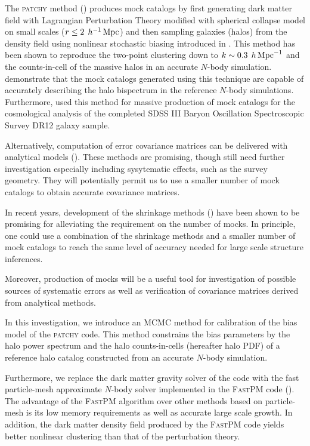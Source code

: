 The \textsc{patchy} method (\citealt{kitaura2014,kitaura2015}) produces mock catalogs by first generating dark matter field with Lagrangian Perturbation Theory modified with spherical collapse model on small scales ($r \leq 2 \; \,h^{-1}\,{\rm Mpc}$) and then sampling galaxies (halos) from the density field using nonlinear stochastic biasing introduced in \citet{kitaura2014}. This method has been shown to reproduce the two-point clustering down to $k \sim 0.3 \; \,h\,{\rm Mpc}^{-1}$ and the counts-in-cell of the massive halos in an accurate $N$-body simulation. \citet{kitaura2015} demonstrate that the mock catalogs generated using this technique are capable of accurately describing the halo bispectrum in the reference $N$-body simulations. Furthermore, \citet{kitaura2016} used this method for massive production of mock catalogs for the cosmological analysis of the completed SDSS III Baryon Oscillation Spectroscopic Survey DR12 galaxy sample. 

Alternatively, computation of error covariance matrices can be delivered with analytical models (\citealt{feldman1994,smith2008,crocce2011,sun2013,grieb2016,klaus2016}). 
These methods are promising, though still need further investigation especially including sysytematic effects, such as the survey geometry. They will potentially permit us to use a smaller number of mock catalogs to obtain accurate covariance matrices.

In recent years, development of the shrinkage methods (\citealt{ledoit2004,pope2008,ledoit2012,joachimi2016,simpson2016}) have been shown to be promising for alleviating the requirement on the number of mocks. In principle, one could use a combination of the shrinkage methods and a smaller number of mock catalogs to reach the same level of accuracy needed for large scale structure inferences.    

Moreover, production of mocks will be a useful tool for investigation of possible sources of systematic errors as well as verification of covariance matrices derived from analytical methods.

In this investigation, we introduce an MCMC method for calibration of the bias model of the \textsc{patchy} code. This method constrains the bias parameters by the halo power spectrum and the halo counts-in-cells (hereafter halo PDF) of a  reference halo catalog constructed from an accurate $N$-body simulation. 

Furthermore, we replace the dark matter gravity solver of the code with the fast particle-mesh approximate $N$-body solver implemented in the \textsc{FastPM} code (\citealt{fastpm}). The advantage of the \textsc{FastPM} algorithm over other methods based on particle-mesh is its low memory requirements as well as accurate large scale growth. In addition, the dark matter density field produced by the \textsc{FastPM} code yields better nonlinear clustering than that of the perturbation theory. 

